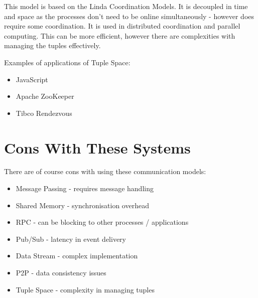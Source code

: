 This model is based on the Linda Coordination Models. It is decoupled in time and space as the processes don't need to be online simultaneously - however does require some coordination. It is used in distributed coordination and parallel computing. This can be more efficient, however there are complexities with managing the tuples effectively.

Examples of applications of Tuple Space:
\begin{itemize}
    \item JavaScript
    \item Apache ZooKeeper
    \item Tibco Rendezvous
\end{itemize}

\section{Cons With These Systems}
There are of course cons with using these communication models:
\begin{itemize}
    \item Message Passing - requires message handling
    \item Shared Memory - synchronisation overhead
    \item RPC - can be blocking to other processes / applications
    \item Pub/Sub - latency in event delivery
    \item Data Stream - complex implementation
    \item P2P - data consistency issues
    \item Tuple Space - complexity in managing tuples
\end{itemize}